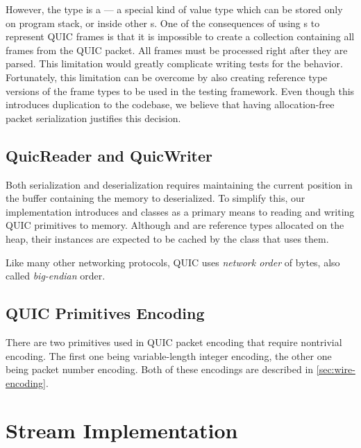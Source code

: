 However, the  type is a  --- a special kind of value type which can
be stored only on program stack, or inside other s. One of the consequences of
using s to represent QUIC frames is that it is impossible to create a collection
containing all frames from the QUIC packet. All frames must be processed right after they are
parsed. This limitation would greatly complicate writing tests for the 
behavior. Fortunately, this limitation can be overcome by also creating reference type versions of
the frame types to be used in the testing framework. Even though this introduces duplication to the
codebase, we believe that having allocation-free packet serialization justifies this decision.

\subsection{QuicReader and QuicWriter}

Both serialization and deserialization requires maintaining the current position in the buffer
containing the memory to deserialized. To simplify this, our implementation introduces \QuicReader{}
and \QuicWriter{} classes as a primary means to reading and writing QUIC primitives to memory.
Although \QuicReader{} and \QuicWriter{} are reference types allocated on the heap, their instances
are expected to be cached by the class that uses them.

 Like many
other networking protocols, QUIC uses \textit{network order} of bytes, also called
\textit{big-endian} order.

\subsection{QUIC Primitives Encoding}

There are two primitives used in QUIC packet encoding that require nontrivial encoding. The first
one being variable-length integer encoding, the other one being packet number encoding. Both of
these encodings are described in \autoref{sec:wire-encoding}.


\section{Stream Implementation}


